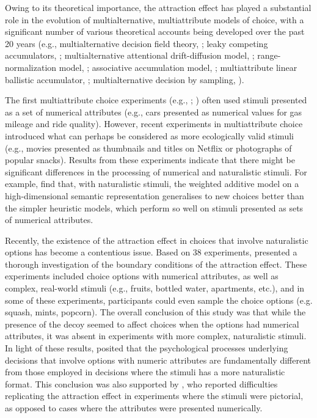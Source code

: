 \documentclass[12pt, a4paper]{article}
\begin{document}
Owing to its theoretical importance, the attraction effect has played a substantial role in the evolution of multialternative, multiattribute models of choice, with a significant number of various theoretical accounts being developed over the past 20 years (e.g., multialternative decision field theory, ; leaky competing accumulators, ; multialternative attentional drift-diffusion model,   ; range-normalization model, ; associative accumulation model, ; multiattribute linear ballistic accumulator, ; multialternative decision by sampling, ). 

The first multiattribute choice experiments (e.g., ; ) often used stimuli presented as a set of numerical attributes (e.g., cars presented as numerical values for gas mileage and ride quality). However, recent experiments in multiattribute choice introduced what can perhaps be considered as more ecologically valid stimuli (e.g., movies presented as thumbnails and titles on Netflix or photographs of popular snacks). Results from these experiments indicate that there might be significant differences in the processing of numerical and naturalistic stimuli. For example,  find that, with naturalistic stimuli, the weighted additive model on a high-dimensional semantic representation generalises to new choices better than the simpler heuristic models, which perform so well on stimuli presented as sets of numerical attributes. 

Recently, the existence of the attraction effect in choices that involve naturalistic options has become a contentious issue. Based on 38 experiments,  presented a thorough investigation of the boundary conditions of the attraction effect. These experiments included choice options with numerical attributes, as well as complex, real-world stimuli (e.g., fruits, bottled water, apartments, etc.), and in some of these experiments, participants could even sample the choice options (e.g. squash, mints, popcorn). The overall conclusion of this study was that while the presence of the decoy seemed to affect choices when the options had numerical attributes, it was absent in experiments with more complex, naturalistic stimuli. In light of these results, \citeauthor{Frederick2014} posited that the psychological processes underlying decisions that involve options with numeric attributes are fundamentally different from those employed in decisions where the stimuli has a more naturalistic format. This conclusion was also supported by , who reported difficulties replicating the attraction effect in experiments where the stimuli were pictorial, as opposed to cases where the attributes were presented numerically.
\end{document}
